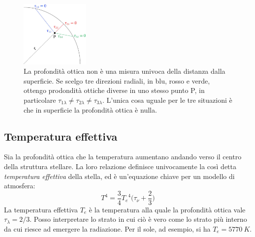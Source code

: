 \begin{figure}
    \centering
    \includegraphics[width=0.3\textwidth]{immagini/profondita-ottica-atmosfera.jpg}
    \caption{La profondità ottica non è una misura univoca della distanza dalla superficie. Se scelgo tre direzioni radiali, in blu, rosso e verde, ottengo prodondità ottiche diverse in uno stesso punto P, in particolare $\tau_{1\lambda} \neq \tau_{2\lambda} \neq \tau_{3\lambda}$. L'unica cosa uguale per le tre situazioni è che in superficie la profondità ottica è nulla.}
    \label{fig:profondita-ottica-atmosfera}
\end{figure}

\subsection{Temperatura effettiva}
Sia la profondità ottica che la temperatura aumentano andando verso il centro della struttura stellare. La loro relazione definisce univocamente la così detta \emph{temperatura effettiva} della stella, ed è un'equazione chiave per un modello di atmosfera:
\begin{equation}\label{temperatura-effettiva}
    T^4 = \frac{3}{4} {T_e}^4 \bigl( \tau_\nu + \frac{2}{3} \bigr)
\end{equation}
La temperatura effettiva $T_e$ è la temperatura alla quale la profondità ottica vale $\tau_\lambda = 2 / 3$. Posso interpretare lo strato in cui ciò è vero come lo strato più interno da cui riesce ad emergere la radiazione. Per il sole, ad esempio, si ha $T_e = \SI{5770}{K}$.

